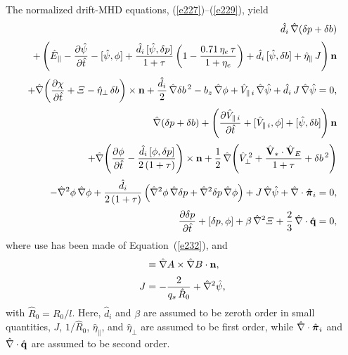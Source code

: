 \documentclass[notitlepage,12pt]{article}
\newcommand{\bpi}{\mbox{\boldmath$\pi$}}
\begin{document}
 The normalized drift-MHD equations, (\ref{e227})--(\ref{e229}), yield 
 \begin{align}\label{e247}
 \hat{d}_i\,\hat{\nabla}(\delta p + \delta b)\nonumber\\[0.5ex]+ \left(\hat{E}_{\parallel}-\frac{\partial\hat{\psi}}{\partial \hat{t}} - [\hat{\psi},\phi]+ \frac{\hat{d}_i\,[\hat{\psi},\delta p]}{1+\tau}\left(1-\frac{0.71\,\eta_e\,\tau}{1+\eta_e}\right)
 + \hat{d}_i\,[\hat{\psi},\delta b]+ \hat{\eta}_\parallel\,J\right){\bf n}\nonumber\\[0.5ex]
 +\hat{\nabla}\!\left(\frac{\partial\chi}{\partial \hat{t}} + {\mit\Xi} -\hat{\eta}_\perp\,\delta b\right)\times {\bf n} + \frac{\hat{d}_i}{2}\,\hat{\nabla}\delta b^{\,2}- b_z\,\hat{\nabla}\phi + \hat{V}_{\parallel\,i}\,\hat{\nabla}\hat{\psi}
+  \hat{d}_i\,J\,\hat{\nabla}\hat{\psi}= 0,\\[0.5ex]
 \hat{\nabla}(\delta p + \delta b) + \left(\frac{\partial \hat{V}_{\parallel\,i}}{\partial \hat{t}} + [\hat{V}_{\parallel\,i},\phi] + [\hat{\psi},\delta b]\right){\bf n}\nonumber\\[0.5ex]
 +\hat{\nabla}\!\left(\frac{\partial\phi}{\partial \hat{t}} - \frac{\hat{d}_i\,[\phi,\delta p]}{2\,(1+\tau)}\right)\times {\bf n} 
 + \frac{1}{2}\,\hat{\nabla}\!
 \left(\hat{V}_\perp^{\,2}+ \frac{\hat{\bf V}_\ast\cdot\hat{\bf V}_E }{1+\tau}+ \delta b^{\,2}\right)  \nonumber\\[0.5ex]
-\hat{\nabla}^2\phi\,\hat{\nabla}\phi + \frac{\hat{d}_i}{2\,(1+\tau)}\left(\hat{\nabla}^2\phi\,\hat{\nabla}\delta p +\hat{\nabla}^2\delta p\,\hat{\nabla}\phi\right) + J\,\hat{\nabla}\hat{\psi} + \hat{\nabla}\cdot\hat{\bpi}_i = 0,\label{e248}\\[0.5ex]
\frac{\partial \delta p}{\partial \hat{t}} + [\delta p,\phi] +\beta\,\hat{\nabla}^2{\mit\Xi} + \frac{2}{3}\,\hat{\nabla}\cdot \hat{\bf q}= 0,\label{e249}
 \end{align}
 where use has been made of Equation~(\ref{e232}), and
 \begin{align}
 [A,B] &\equiv \hat{\nabla} A\times \hat{\nabla} B\cdot{\bf n},\\[0.5ex]
 J &= -\frac{2}{q_s\,\hat{R}_0}+ \hat{\nabla}^2\hat{\psi},\label{eJ}
 \end{align}
 with $\hat{R}_0=R_0/l$. 
 Here, $\hat{d}_i$ and $\beta$ are assumed to be zeroth order in small quantities, $J$, $1/\hat{R}_0$, $\hat{\eta}_\parallel$, and $\hat{\eta}_\perp$ are assumed to be first order, while $\hat{\nabla}\cdot \hat{\bpi}_{i}$ and $\hat{\nabla}\cdot\hat{\bf q}$ are assumed to be second order. 
 
\end{document}
